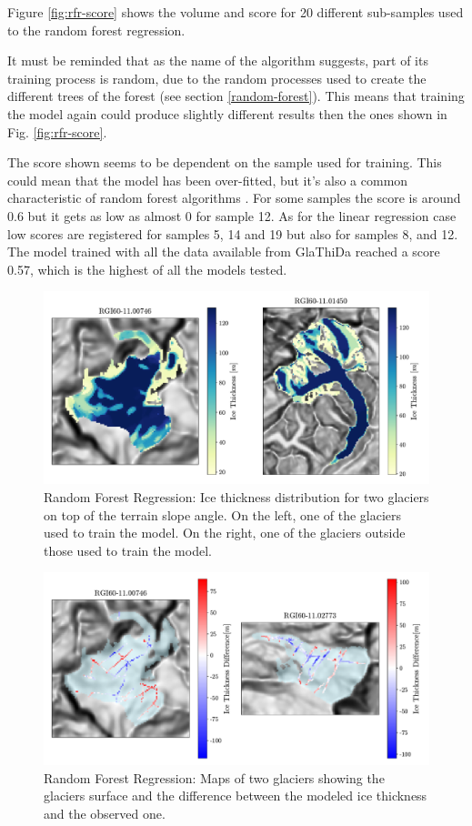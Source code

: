 Figure \ref{fig:rfr-score} shows the volume and score for 20 different sub-samples used to the random forest regression. 

It must be reminded that as the name of the algorithm suggests, part of its training process is random, due to the random processes used to create the different trees of the forest (see section \ref{random-forest}). This means that training the model again could produce slightly different results then the ones shown in Fig. \ref{fig:rfr-score}.

The score shown seems to be dependent on the sample used for training. This could mean that the model has been over-fitted, but it's also a common characteristic of random forest algorithms \citep{RandomForest2018}. For some samples the score is around 0.6 but it gets as low as almost 0 for sample 12. As for the linear regression case low scores are registered for samples 5, 14 and 19 but also for samples 8, and 12. 
The model trained with all the data available from GlaThiDa reached a score 0.57, which is the highest of all the models tested.


\begin{figure}[!tp]
	\centering		  
	\includegraphics[width=1.\textwidth]{figures/RFR_thick_map.pdf}
	\caption{Random Forest Regression: Ice thickness distribution for two glaciers on top of the terrain slope angle. On the left, one of the glaciers used to train the model. On the right, one of the glaciers outside those used to train the model.}
	\label{fig:rfr-map}
\end{figure}

\begin{figure}[!tp]
	\centering		  
	\includegraphics[width=1.\textwidth]{figures/RFR_thick_diff_map.pdf}
	\caption{Random Forest Regression: Maps of two glaciers showing the glaciers surface and the difference between the modeled ice thickness and the observed one.}
	\label{fig:rfr-diff-map}
\end{figure}

